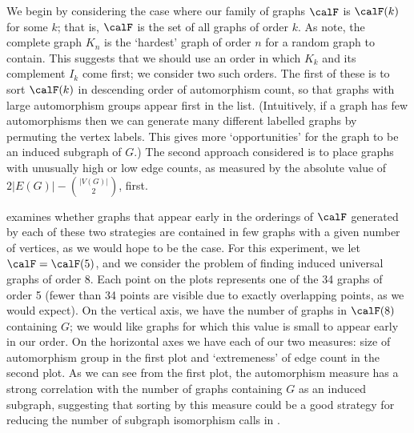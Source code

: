 We begin by considering the case where our family of graphs $\calF$
is $\calF(k)$ for some $k$; that is,
$\calF$ is the set of all graphs of order $k$.
As \cite{chatterjee2021isomorphisms} note, the complete
graph $K_n$ is the `hardest' graph of order $n$ for a random graph to contain.
This suggests
that we should use an order in which $K_k$ and its complement $I_k$ come
first; we consider two such orders.  The first of these is to sort $\calF(k)$ in descending
order of automorphism count, so that
graphs with large automorphism groups appear first in the list.  (Intuitively, if a graph
has few automorphisms then we can generate many different labelled graphs
by permuting the vertex labels.  This gives more `opportunities' for the
graph to be an induced subgraph of $G$.)
The second approach considered is to place graphs
with unusually high or low edge counts, as measured by the absolute value of
${2|E(G)| - {|V(G)| \choose 2}}$, first.

 examines whether graphs that appear early in the orderings
of $\calF$
generated by each of these two strategies are contained in few graphs with
a given number of vertices, as we would hope to be the case.
For this experiment, we let $\calF = \calF(5)$, and we consider the problem
of finding induced universal graphs of order 8.
Each point on the plots
represents one of the 34 graphs of order 5 (fewer than 34 points are visible
due to exactly overlapping points, as we would expect).  On the vertical
axis, we have the number of graphs in $\calF(8)$ containing $G$; we would like
graphs for which this value is small to appear early in our order.
On the horizontal axes we have each of our two measures: size of automorphism group
in the first plot and `extremeness' of edge count in the second plot.
As we can see from the first plot, the automorphism measure has a strong correlation
with the number of graphs containing $G$ as an induced subgraph, suggesting that
sorting by this measure could be a good strategy for reducing the number of
subgraph isomorphism calls in .

